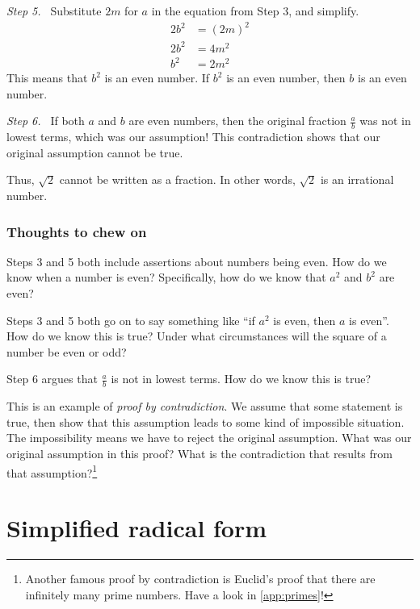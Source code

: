 \textit{Step 5.~} Substitute $2m$ for $a$ in the equation from Step 3, and simplify.\[\begin{aligned} 2b^2 &= (2m)^2 \\ 2b^2 &= 4m^2 \\ b^2 &= 2m^2 \end{aligned}\] This means that $b^2$ is an even number. If $b^2$ is an even number, then $b$ is an even number.

\textit{Step 6.~} If both $a$ and $b$ are even numbers, then the original fraction $\frac{a}{b}$ was not in lowest terms, which was our assumption! This contradiction shows that our original assumption cannot be true.

Thus, $\sqrt{2}$ cannot be written as a fraction. In other words, $\sqrt2$ is an irrational number.

\subsubsection{Thoughts to chew on}

Steps 3 and 5 both include assertions about numbers being even. How do we know when a number is even? Specifically, how do we know that $a^2$ and $b^2$ are even?

Steps 3 and 5 both go on to say something like ``if $a^2$ is even, then $a$ is even''. How do we know this is true? Under what circumstances will the square of a number be even or odd?

Step 6 argues that $\frac{a}{b}$ is not in lowest terms. How do we know this is true?

This is an example of \textit{proof by contradiction}. We assume that some statement is true, then show that this assumption leads to some kind of impossible situation. The impossibility means we have to reject the original assumption. What was our original assumption in this proof? What is the contradiction that results from that assumption?\footnote{Another famous proof by contradiction is Euclid's proof that there are infinitely many prime numbers. Have a look in \cref{app:primes}!}

\section{Simplified radical form}
\label{sec:radsimplifiedform}


